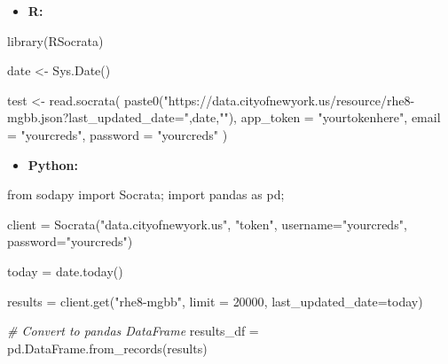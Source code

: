 \documentclass[
]{book}
\newenvironment{Shaded}{\begin{snugshade}}{\end{snugshade}}
\newcommand{\AttributeTok}[1]{\textcolor[rgb]{0.77,0.63,0.00}{#1}}
\newcommand{\CommentTok}[1]{\textcolor[rgb]{0.56,0.35,0.01}{\textit{#1}}}
\newcommand{\DecValTok}[1]{\textcolor[rgb]{0.00,0.00,0.81}{#1}}
\newcommand{\FunctionTok}[1]{\textcolor[rgb]{0.00,0.00,0.00}{#1}}
\newcommand{\NormalTok}[1]{#1}
\newcommand{\OtherTok}[1]{\textcolor[rgb]{0.56,0.35,0.01}{#1}}
\newcommand{\StringTok}[1]{\textcolor[rgb]{0.31,0.60,0.02}{#1}}
\providecommand{\tightlist}{%
  \setlength{\itemsep}{0pt}\setlength{\parskip}{0pt}}
\begin{document}
\begin{itemize}
\tightlist
\item
  \textbf{R:}
\end{itemize}

\begin{Shaded}
\begin{Highlighting}[]
\FunctionTok{library}\NormalTok{(RSocrata)}

\NormalTok{date }\OtherTok{\textless{}{-}} \FunctionTok{Sys.Date}\NormalTok{()}

\NormalTok{test }\OtherTok{\textless{}{-}} \FunctionTok{read.socrata}\NormalTok{(}
  \FunctionTok{paste0}\NormalTok{(}\StringTok{"https://data.cityofnewyork.us/resource/rhe8{-}mgbb.json?last\_updated\_date="}\NormalTok{,date,}\StringTok{""}\NormalTok{),}
  \AttributeTok{app\_token =} \StringTok{"yourtokenhere"}\NormalTok{,}
  \AttributeTok{email     =} \StringTok{"yourcreds"}\NormalTok{,}
  \AttributeTok{password  =} \StringTok{"yourcreds"}
\NormalTok{)}
\end{Highlighting}
\end{Shaded}

\begin{itemize}
\tightlist
\item
  \textbf{Python:}
\end{itemize}

\begin{Shaded}
\begin{Highlighting}[]
\NormalTok{from sodapy import Socrata;}
\NormalTok{import pandas as pd;}

\NormalTok{client }\OtherTok{=} \FunctionTok{Socrata}\NormalTok{(}\StringTok{"data.cityofnewyork.us"}\NormalTok{,}
                 \StringTok{"token"}\NormalTok{,}
                 \AttributeTok{username=}\StringTok{"yourcreds"}\NormalTok{,}
                 \AttributeTok{password=}\StringTok{"yourcreds"}\NormalTok{)}

\NormalTok{today }\OtherTok{=} \FunctionTok{date.today}\NormalTok{()}

\NormalTok{results }\OtherTok{=} \FunctionTok{client.get}\NormalTok{(}\StringTok{"rhe8{-}mgbb"}\NormalTok{, }\AttributeTok{limit =} \DecValTok{20000}\NormalTok{, }\AttributeTok{last\_updated\_date=}\NormalTok{today)}

\CommentTok{\# Convert to pandas DataFrame}
\NormalTok{results\_df }\OtherTok{=} \FunctionTok{pd.DataFrame.from\_records}\NormalTok{(results) }
\end{Highlighting}
\end{Shaded}
\end{document}
